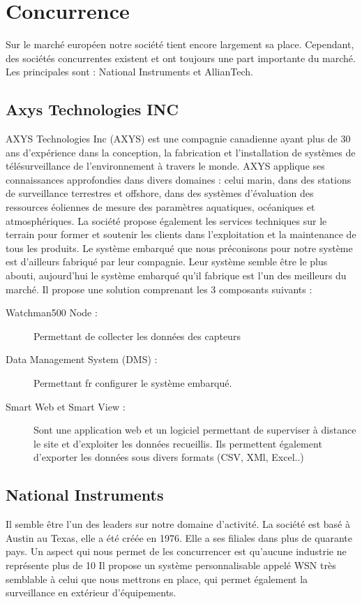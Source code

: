 \section{Concurrence}

Sur le marché européen notre société tient encore largement sa place. Cependant, des sociétés concurrentes existent et ont toujours une part importante du marché. Les principales sont : National Instruments et AllianTech.

        \subsection{Axys Technologies INC}
        AXYS Technologies Inc (AXYS) est une compagnie canadienne ayant plus de 30 ans d'expérience dans la conception, la fabrication et l'installation de systèmes de télésurveillance de l'environnement à travers le monde. AXYS applique ses connaissances approfondies dans divers domaines : celui marin, dans des stations de surveillance terrestres et offshore, dans des systèmes d'évaluation des ressources éoliennes de mesure des paramètres aquatiques, océaniques et atmosphériques. La société propose également les services techniques sur le terrain pour former et soutenir les clients dans l'exploitation et la maintenance de tous les produits. Le système embarqué que nous préconisons pour notre système est d'ailleurs fabriqué par leur compagnie. Leur système semble être le plus abouti, aujourd'hui le système embarqué qu'il fabrique est l'un des meilleurs du marché. Il propose une solution comprenant les 3 composants suivants :
\begin{description}
           \item[Watchman500 Node :] Permettant de collecter les données des capteurs
           \item[Data Management System (DMS) :] Permettant fr configurer le système embarqué.
           \item[Smart Web et Smart View :] Sont une application web et un logiciel permettant de superviser à distance le site et d'exploiter les données recueillis. Ils permettent également d'exporter les données sous divers formats (CSV, XMl, Excel..)
\end{description}

        \subsection{National Instruments}
        Il semble être l'un des leaders sur notre domaine d'activité. La société est basé à Austin au Texas, elle a été créée en 1976. Elle a ses filiales dans plus de quarante pays. Un aspect qui nous permet de les concurrencer est qu'aucune industrie ne représente plus de 10%
        Il propose un système personnalisable appelé WSN très semblable à celui que nous mettrons en place, qui permet également la surveillance en extérieur d'équipements.
